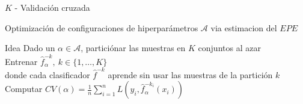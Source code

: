 \documentclass[xcolor=x11names]{beamer}
\begin{document}

\begin{frame}{$K$ - Validación cruzada}

Optimización de configuraciones de hiperparámetros $\mathcal{A}$ via estimacion del $EPE$

	\begin{block}{Idea}
		Dado un $\alpha \in \mathcal{A}$, particiónar las muestras en $K$ conjuntos al azar
		\\
		Entrenar $\hat{f}_{\alpha}^{-k}, \ k \in \{1, \ldots, K\}$
		\\
		donde cada clasificador $\hat{f}^{-k}$ aprende sin usar las muestras de la partición $k$
		\\
		Computar $CV(\alpha) = \frac{1}{n} \sum^n_{i=1} L\left( y_i, \hat{f}_{\alpha}^{-k_i}(x_i) \right)$
	\end{block}

\end{frame}
\end{document}
